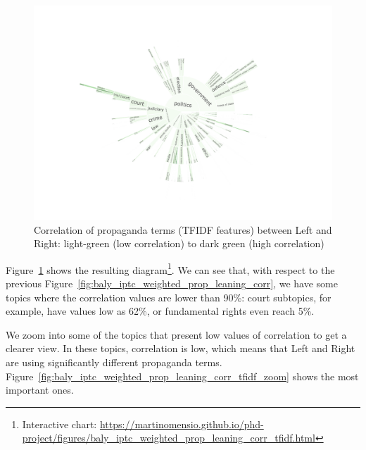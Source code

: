 \begin{figure}[!htbp]
    \centering
    \includegraphics[trim={2.2cm 2cm 2.2cm 2cm},clip,width=\linewidth]{figures/baly_iptc_weighted_prop_leaning_corr_tfidf.pdf}
    \caption{Correlation of propaganda terms (TFIDF features) between Left and Right: light-green (low correlation) to dark green (high correlation)}
    \label{fig:baly_iptc_weighted_prop_leaning_corr_tfidf}
\end{figure}

Figure~\ref{fig:baly_iptc_weighted_prop_leaning_corr_tfidf} shows the resulting diagram\footnote{Interactive chart: \url{https://martinomensio.github.io/phd-project/figures/baly_iptc_weighted_prop_leaning_corr_tfidf.html}}. We can see that, with respect to the previous Figure~\ref{fig:baly_iptc_weighted_prop_leaning_corr}, we have some topics where the correlation values are lower than 90\%: court subtopics, for example, have values low as 62\%, or fundamental rights even reach 5\%.

We zoom into some of the topics that present low values of correlation to get a clearer view. In these topics, correlation is low, which means that Left and Right are using significantly different propaganda terms. Figure~\ref{fig:baly_iptc_weighted_prop_leaning_corr_tfidf_zoom} shows the most important ones.

